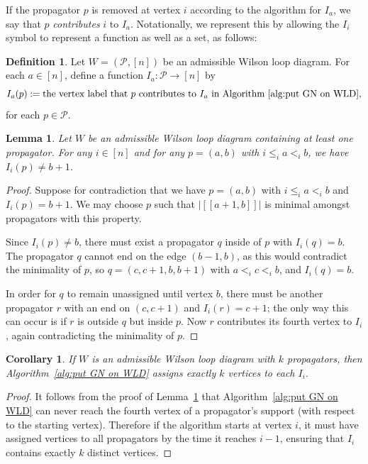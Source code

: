 \documentclass[11pt]{article}
\newcommand{\cP}{\mathcal{P}}
\newcommand{\interval}[2]{[\![#1,#2]\!]}
\newtheorem{lem}[thm]{Lemma}
\newtheorem{cor}[thm]{Corollary}
\theoremstyle{remark}
\theoremstyle{definition}
\newtheorem{dfn}[thm]{Definition}
\begin{document}
If the propagator $p$ is removed at vertex $i$ according to the algorithm for $I_a$, we say that $p$ \emph{contributes} $i$ to $I_a$. Notationally, we represent this by allowing the $I_i$ symbol to represent a function as well as a set, as follows:
\begin{dfn}\label{def I_i as a function}
Let $W = (\cP, [n])$ be an admissible Wilson loop diagram. For each $a \in [n]$, define a function $I_a : \cP \longrightarrow [n]$ by
\[I_a(p) := \text{the vertex label that $p$ contributes to $I_a$ in Algorithm~\ref{alg:put GN on WLD},}\]
for each $p \in \cP$.
\end{dfn}


\begin{lem}\label{lem no fourth vertex}
Let $W$ be an admissible Wilson loop diagram containing at least one propagator. For any $i \in [n]$ and for any $p=(a,b)$ with $i\leq_i a <_i b$, we have $I_i(p) \neq b+1$.
\end{lem}
\begin{proof}
Suppose for contradiction that we have $p = (a,b)$ with $i\leq_i a <_i b$ and $I_{i}(p) = b+1$. We may choose $p$ such that $|\interval{a+1}{b}|$ is minimal amongst propagators with this property.

Since $I_i(p) \neq b$, there must exist a propagator $q$ inside of $p$ with $I_i(q) = b$. The propagator $q$ cannot end on the edge $(b-1,b)$, as this would contradict the minimality of $p$, so $q = (c,c+1,b,b+1)$ with $a <_i c <_i b$, and $I_i(q) = b$. 

In order for $q$ to remain unassigned until vertex $b$, there must be another propagator $r$ with an end on $(c,c+1)$ and $I_i(r) = c+1$; the only way this can occur is if $r$ is outside $q$ but inside $p$. Now $r$ contributes its fourth vertex to $I_i$, again contradicting the minimality of $p$.
\end{proof}

\begin{cor}\label{GN alg well defined}
If $W$ is an admissible Wilson loop diagram with $k$ propagators, then Algorithm~\ref{alg:put GN on WLD} assigns exactly $k$ vertices to each $I_i$.
\end{cor}
\begin{proof}
It follows from the proof of Lemma~\ref{lem no fourth vertex} that Algorithm~\ref{alg:put GN on WLD} can never reach the fourth vertex of a propagator's support (with respect to the starting vertex). Therefore if the algorithm starts at vertex $i$, it must have assigned vertices to all propagators by the time it reaches $i-1$, ensuring that $I_i$ contains exactly $k$ distinct vertices.
\end{proof}
\end{document}
